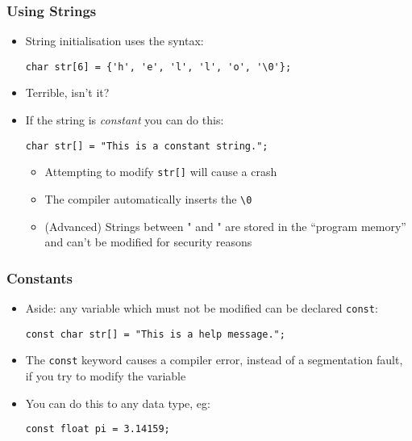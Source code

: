 \documentclass[14pt]{beamer}
\begin{document}
\begin{frame}[fragile]
\frametitle{Using Strings}
\begin{itemize}
\item String initialisation uses the syntax:
\begin{lstlisting}[style=CStyle]
char str[6] = {'h', 'e', 'l', 'l', 'o', '\0'};
\end{lstlisting}
\pause
\item Terrible, isn't it?
\pause
\item If the string is \textit{constant} you can do this:
\begin{lstlisting}[style=CStyle]
char str[] = "This is a constant string.";
\end{lstlisting}
	\begin{itemize}
		\item Attempting to modify \texttt{str[]} will cause a crash
		\item The compiler automatically inserts the \texttt{\textbackslash 0}
		\item (Advanced) Strings between " and " are stored in the ``program memory'' and can't be modified for security reasons
	\end{itemize}
\end{itemize}
\end{frame}

\begin{frame}[fragile]
\frametitle{Constants}
\begin{itemize}
\item Aside: any variable which must not be modified can be declared \texttt{const}:
\begin{lstlisting}[style=CStyle]
const char str[] = "This is a help message.";
\end{lstlisting}
\item The \texttt{const} keyword causes a compiler error, instead of a segmentation fault, if you try to modify the variable
\item You can do this to any data type, eg:
\begin{lstlisting}[style=CStyle]
const float pi = 3.14159;
\end{lstlisting}
\end{itemize}
\end{frame}
\end{document}
